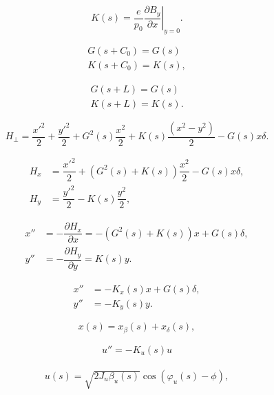 \begin{equation}
    K(s) = \dfrac{e}{p_0} \left.\dfrac{\partial B_y}{\partial x}\right|_{y=0}.
\end{equation}



\begin{align*}
    G(s+C_0) = G(s) \\
    K(s+C_0) = K(s),
\end{align*}



\begin{align*}
    G(s+L) = G(s) \\
    K(s+L) = K(s).
\end{align*}


\begin{equation}
    H_{\perp} = \dfrac{x'^2}{2} + \dfrac{y'^2}{2} + G^2(s)\dfrac{x^2}{2} + K(s)\dfrac{\left(x^2 - y^2\right)}{2} - G(s) x\delta.
\end{equation}



\begin{align*}
   H_x & =  \dfrac{x'^2}{2}  + \left(G^2(s)+K(s)\right)\dfrac{x^2}{2} - G(s) x\delta, \\
   H_y &= \dfrac{y'^2}{2}  -K(s)\dfrac{y^2}{2},
\end{align*}


\begin{align}
    x'' &= - \dfrac{\partial H_{x}}{\partial x}  = -\left(G^2(s) + K(s)\right)x + G(s)\delta, \\
    y'' &= - \dfrac{\partial H_{y}}{\partial y}  = K(s)y.
\end{align}



\begin{align}
    x'' &= -K_x(s)x + G(s)\delta, \\
    y'' &= - K_y(s)y.
\end{align}


\begin{equation}
    x(s) = x_\beta (s) + x_\delta (s),
\end{equation}

\begin{align}
    u'' = -K_u(s) u
    \label{hill}
\end{align}

\begin{align}
    u(s) = \sqrt{2J_u\beta_u(s)}\cos\left(\varphi_u(s) - \phi\right),
\end{align}


